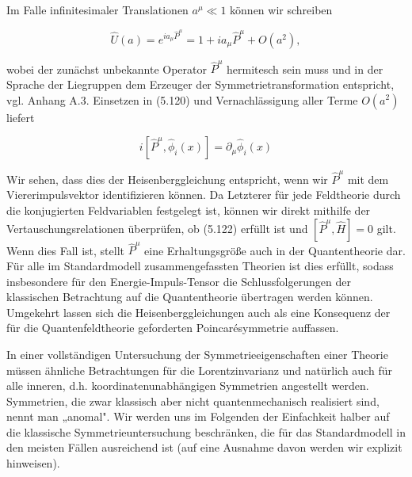 \documentclass[10pt, letterpaper]{article}
\begin{document}
Im Falle infinitesimaler Translationen $a^{\mu} \ll 1$ können wir schreiben

$$
\hat{U}(a)=e^{i a_{\mu} \hat{P}^{\mu}}=1+i a_{\mu} \hat{P}^{\mu}+O\left(a^{2}\right),
$$

wobei der zunächst unbekannte Operator $\hat{P}^{\mu}$ hermitesch sein muss und in der Sprache der Liegruppen dem Erzeuger der Symmetrietransformation entspricht, vgl. Anhang A.3. Einsetzen in (5.120) und Vernachlässigung aller Terme $O\left(a^{2}\right)$ liefert

$$
i\left[\hat{P}^{\mu}, \hat{\phi}_{i}(x)\right]=\partial_{\mu} \hat{\phi}_{i}(x)
$$

Wir sehen, dass dies der Heisenberggleichung entspricht, wenn wir $\hat{P}^{\mu}$ mit dem Viererimpulsvektor identifizieren können. Da Letzterer für jede Feldtheorie durch die konjugierten Feldvariablen festgelegt ist, können wir direkt mithilfe der Vertauschungsrelationen überprüfen, ob (5.122) erfüllt ist und $\left[\hat{P}^{\mu}, \hat{H}\right]=0$ gilt. Wenn dies Fall ist, stellt $\hat{P}^{\mu}$ eine Erhaltungsgröße auch in der Quantentheorie dar. Für alle im Standardmodell zusammengefassten Theorien ist dies erfüllt, sodass insbesondere für den Energie-Impuls-Tensor die Schlussfolgerungen der klassischen Betrachtung auf die Quantentheorie übertragen werden können. Umgekehrt lassen sich die Heisenberggleichungen auch als eine Konsequenz der für die Quantenfeldtheorie geforderten Poincarésymmetrie auffassen.

In einer vollständigen Untersuchung der Symmetrieeigenschaften einer Theorie müssen ähnliche Betrachtungen für die Lorentzinvarianz und natürlich auch für alle inneren, d.h. koordinatenunabhängigen Symmetrien angestellt werden. Symmetrien, die zwar klassisch aber nicht quantenmechanisch realisiert sind, nennt man „anomal". Wir werden uns im Folgenden der Einfachkeit halber auf die klassische Symmetrieuntersuchung beschränken, die für das Standardmodell in den meisten Fällen ausreichend ist (auf eine Ausnahme davon werden wir explizit hinweisen).
\end{document}
